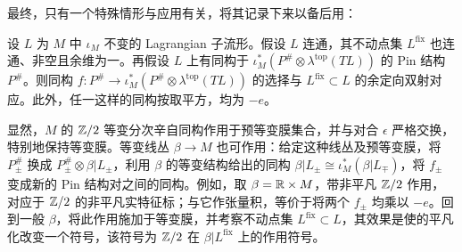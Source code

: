 最终，只有一个特殊情形与应用有关，将其记录下来以备后用：
\begin{lemma}\label{st:14.2}
设 $L$ 为 $M$ 中 $\iota_M$ 不变的 Lagrangian 子流形。假设 $L$ 连通，其不动点集 $L^{\mathrm{fix}}$ 也连通、非空且余维为一。再假设 $L$ 上有同构于 $\iota_M^*(P^\#\otimes\lambda^{\mathrm{top}}(TL))$ 的 Pin 结构 $P^\#$。则同构 $f:P^\#\to\iota_M^*(P^\#\otimes\lambda^{\mathrm{top}}(TL))$ 的选择与 $L^{\mathrm{fix}}\subset L$ 的余定向双射对应。此外，任一这样的同构按取平方，均为 $-e$。
\end{lemma}
显然，$M$ 的 $\mathbb Z/2$ 等变分次辛自同构作用于预等变膜集合，并与对合 $\epsilon$ 严格交换，特别地保持等变膜。等变线丛 $\beta\to M$ 也可作用：给定这种线丛及预等变膜，将 $P_\pm^\#$ 换成 $P_\pm^\#\otimes\beta|L_\pm$，利用 $\beta$ 的等变结构给出的同构 $\beta|L_\pm\cong\iota_M^*(\beta|L_\mp)$，将 $f_\pm$ 变成新的 Pin 结构对之间的同构。例如，取 $\beta=\mathbb R\times M$，带非平凡 $\mathbb Z/2$ 作用，对应于 $\mathbb Z/2$ 的非平凡实特征标；与它作张量积，等价于将两个 $f_\pm$ 均乘以 $-e$。回到一般 $\beta$，将此作用施加于等变膜，并考察不动点集 $L^{\mathrm{fix}}\subset L$，其效果是使的平凡化改变一个符号，该符号为 $\mathbb Z/2$ 在 $\beta|L^{\mathrm{fix}}$ 上的作用符号。
